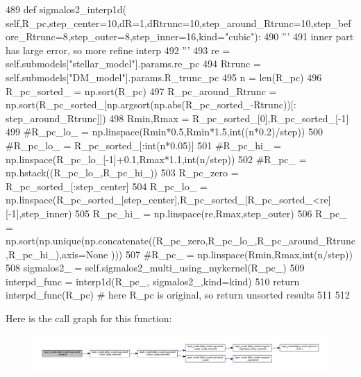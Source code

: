 \begin{DoxyCode}
489     \textcolor{keyword}{def }sigmalos2\_interp1d(
      self,R\_pc,step\_center=10,dR=1,dRtrunc=10,step\_around\_Rtrunc=10,step\_before\_Rtrunc=8,step\_outer=8,step\_inner=16,kind="cubic"):
490         \textcolor{stringliteral}{'''}
491 \textcolor{stringliteral}{        inner part has large error, so more refine interp}
492 \textcolor{stringliteral}{        '''}
493         re = self.submodels[\textcolor{stringliteral}{"stellar\_model"}].params.re\_pc
494         Rtrunc = self.submodels[\textcolor{stringliteral}{"DM\_model"}].params.R\_trunc\_pc
495         n = len(R\_pc)
496         R\_pc\_sorted\_ = np.sort(R\_pc)
497         R\_pc\_around\_Rtrunc = np.sort(R\_pc\_sorted\_[np.argsort(np.abs(R\_pc\_sorted\_-Rtrunc))[:
      step\_around\_Rtrunc]])
498         Rmin,Rmax = R\_pc\_sorted\_[0],R\_pc\_sorted\_[-1]
499         \textcolor{comment}{#R\_pc\_lo\_ = np.linspace(Rmin*0.5,Rmin*1.5,int((n*0.2)/step))}
500         \textcolor{comment}{#R\_pc\_lo\_ = R\_pc\_sorted\_[:int(n*0.05)]}
501         \textcolor{comment}{#R\_pc\_hi\_ = np.linspace(R\_pc\_lo\_[-1]+0.1,Rmax*1.1,int(n/step))}
502         \textcolor{comment}{#R\_pc\_ = np.hstack((R\_pc\_lo\_,R\_pc\_hi\_))}
503         R\_pc\_zero = R\_pc\_sorted\_[:step\_center]
504         R\_pc\_lo\_ = np.linspace(R\_pc\_sorted\_[step\_center],R\_pc\_sorted\_[R\_pc\_sorted\_<re][-1],step\_inner)
505         R\_pc\_hi\_ = np.linspace(re,Rmax,step\_outer)
506         R\_pc\_ = np.sort(np.unique(np.concatenate((R\_pc\_zero,R\_pc\_lo\_,R\_pc\_around\_Rtrunc,R\_pc\_hi\_),axis=\textcolor{keywordtype}{None}
      )))
507         \textcolor{comment}{#R\_pc\_ = np.linspace(Rmin,Rmax,int(n/step))}
508         sigmalos2\_ = self.sigmalos2\_multi\_using\_mykernel(R\_pc\_)
509         interpd\_func = interp1d(R\_pc\_, sigmalos2\_,kind=kind)
510         \textcolor{keywordflow}{return} interpd\_func(R\_pc) \textcolor{comment}{# here R\_pc is original, so return unsorted results}
511         
512 
\end{DoxyCode}
Here is the call graph for this function\+:
\nopagebreak
\begin{figure}[H]
\begin{center}
\leavevmode
\includegraphics[width=350pt]{d0/d25/classdsph__model_1_1dSph__model_a855543fee6bd37d3b2e185c2b9dee49e_cgraph}
\end{center}
\end{figure}
\mbox{\label{classdsph__model_1_1dSph__model_a0f0607e3d81520eb0c4c8b79dd871f0e}} 
